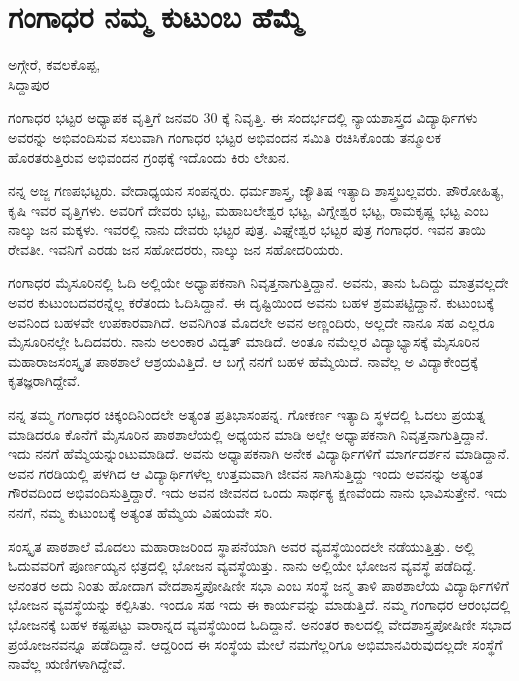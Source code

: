 \chapter{ಗಂಗಾಧರ ನಮ್ಮ ಕುಟುಂಬ ಹೆಮ್ಮೆ}

\begin{center}
\smallskip

ಅಗ್ಗೇರೆ, ಕವಲಕೊಪ್ಪ,\\ 
ಸಿದ್ದಾಪುರ
\addrule
\end{center}
ಗಂಗಾಧರ ಭಟ್ಟರ ಅಧ್ಯಾಪಕ ವೃತ್ತಿಗೆ ಜನವರಿ 30 ಕ್ಕೆ ನಿವೃತ್ತಿ. ಈ ಸಂದರ್ಭದಲ್ಲಿ ನ್ಯಾಯಶಾಸ್ತ್ರದ ವಿದ್ಯಾರ್ಥಿಗಳು ಅವರನ್ನು ಅಭಿವಂದಿಸುವ ಸಲುವಾಗಿ ಗಂಗಾಧರ ಭಟ್ಟರ ಅಭಿವಂದನ ಸಮಿತಿ ರಚಿಸಿಕೊಂಡು ತನ್ಮೂಲಕ ಹೊರತರುತ್ತಿರುವ ಅಭಿವಂದನ ಗ್ರಂಥಕ್ಕೆ ಇದೊಂದು ಕಿರು ಲೇಖನ.

ನನ್ನ ಅಜ್ಜ ಗಣಪಭಟ್ಟರು. ವೇದಾಧ್ಯಯನ ಸಂಪನ್ನರು. ಧರ್ಮಶಾಸ್ತ್ರ, ಜ್ಯೌತಿಷ ಇತ್ಯಾದಿ ಶಾಸ್ತ್ರಬಲ್ಲವರು. ಪೌರೋಹಿತ್ಯ, ಕೃಷಿ ಇವರ ವೃತ್ತಿಗಳು. ಅವರಿಗೆ ದೇವರು ಭಟ್ಟ, ಮಹಾಬಲೇಶ್ವರ ಭಟ್ಟ, ವಿಗ್ನೇಶ್ವರ ಭಟ್ಟ, ರಾಮಕೃಷ್ಣ ಭಟ್ಟ ಎಂಬ ನಾಲ್ಕು ಜನ ಮಕ್ಕಳು. ಇವರಲ್ಲಿ ನಾನು ದೇವರು ಭಟ್ಟರ ಪುತ್ರ. ವಿಘ್ನೇಶ್ವರ ಭಟ್ಟರ ಪುತ್ರ ಗಂಗಾಧರ. ಇವನ ತಾಯಿ ರೇವತೀ. ಇವನಿಗೆ ಎರಡು ಜನ ಸಹೋದರರು, ನಾಲ್ಕು ಜನ ಸಹೋದರಿಯರು.

ಗಂಗಾಧರ ಮೈಸೂರಿನಲ್ಲಿ ಓದಿ ಅಲ್ಲಿಯೇ ಅಧ್ಯಾಪಕನಾಗಿ ನಿವೃತ್ತನಾಗುತ್ತಿದ್ದಾನೆ. ಅವನು, ತಾನು ಓದಿದ್ದು ಮಾತ್ರವಲ್ಲದೇ ಅವರ ಕುಟುಂಬದವರನ್ನೆಲ್ಲ ಕರೆತಂದು ಓದಿಸಿದ್ದಾನೆ. ಈ ದೃಷ್ಟಿಯಿಂದ ಅವನು ಬಹಳ ಶ್ರಮಪಟ್ಟಿದ್ದಾನೆ. ಕುಟುಂಬಕ್ಕೆ ಅವನಿಂದ ಬಹಳವೇ ಉಪಕಾರವಾಗಿದೆ. ಅವನಿಗಿಂತ ಮೊದಲೇ ಅವನ ಅಣ್ಣಂದಿರು, ಅಲ್ಲದೇ ನಾನೂ ಸಹ ಎಲ್ಲರೂ ಮೈಸೂರಿನಲ್ಲೇ ಓದಿದವರು. ನಾನು ಅಲಂಕಾರ ವಿದ್ವತ್ ಮಾಡಿದೆ. ಅಂತೂ ನಮೆಲ್ಲರ ವಿದ್ಯಾಭ್ಯಾಸಕ್ಕೆ ಮೈಸೂರಿನ ಮಹಾರಾಜಸಂಸ್ಕೃತ ಪಾಠಶಾಲೆ ಆಶ್ರಯವಿತ್ತಿದೆ. ಆ ಬಗ್ಗೆ ನನಗೆ ಬಹಳ ಹೆಮ್ಮೆಯಿದೆ. ನಾವೆಲ್ಲ ಅ ವಿದ್ಯಾಕೇಂದ್ರಕ್ಕೆ ಕೃತಜ್ಞರಾಗಿದ್ದೇವೆ. 

ನನ್ನ ತಮ್ಮ ಗಂಗಾಧರ ಚಿಕ್ಕಂದಿನಿಂದಲೇ ಅತ್ಯಂತ ಪ್ರತಿಭಾಸಂಪನ್ನ. ಗೋಕರ್ಣ ಇತ್ಯಾದಿ ಸ್ಥಳದಲ್ಲಿ ಓದಲು ಪ್ರಯತ್ನ ಮಾಡಿದರೂ ಕೊನೆಗೆ ಮೈಸೂರಿನ ಪಾಠಶಾಲೆಯಲ್ಲಿ ಅಧ್ಯಯನ ಮಾಡಿ ಅಲ್ಲೇ ಅಧ್ಯಾಪಕನಾಗಿ ನಿವೃತ್ತನಾಗುತ್ತಿದ್ದಾನೆ. ಇದು ನನಗೆ ಹೆಮ್ಮೆಯನ್ನುಂಟುಮಾಡಿದೆ. ಅವನು ಅಧ್ಯಾಪಕನಾಗಿ ಅನೇಕ ವಿದ್ಯಾರ್ಥಿಗಳಿಗೆ ಮಾರ್ಗದರ್ಶನ ಮಾಡಿದ್ದಾನೆ. ಅವನ ಗರಡಿಯಲ್ಲಿ ಪಳಗಿದ ಆ ವಿದ್ಯಾರ್ಥಿಗಳೆಲ್ಲ ಉತ್ತಮವಾಗಿ ಜೀವನ ಸಾಗಿಸುತ್ತಿದ್ದು ಇಂದು ಅವನನ್ನು ಅತ್ಯಂತ ಗೌರವದಿಂದ ಅಭಿವಂದಿಸುತ್ತಿದ್ದಾರೆ. ಇದು ಅವನ ಜೀವನದ ಒಂದು ಸಾರ್ಥಕ್ಯ ಕ್ಷಣವೆಂದು ನಾನು ಭಾವಿಸುತ್ತೇನೆ. ಇದು ನನಗೆ, ನಮ್ಮ ಕುಟುಂಬಕ್ಕೆ ಅತ್ಯಂತ ಹೆಮ್ಮೆಯ ವಿಷಯವೇ ಸರಿ.

ಸಂಸ್ಕೃತ ಪಾಠಶಾಲೆ ಮೊದಲು ಮಹಾರಾಜರಿಂದ ಸ್ಥಾಪನೆಯಾಗಿ ಅವರ ವ್ಯವಸ್ಥೆಯಿಂದಲೇ ನಡೆಯುತ್ತಿತ್ತು. ಅಲ್ಲಿ ಓದುವವರಿಗೆ ಪೂರ್ಣಯ್ಯನ ಛತ್ರದಲ್ಲಿ ಭೋಜನ ವ್ಯವಸ್ಥೆಯಿತ್ತು. ನಾನು ಅಲ್ಲಿಯೇ ಭೋಜನ ವ್ಯವಸ್ಥೆ ಪಡೆದಿದ್ದೆ. ಅನಂತರ ಅದು ನಿಂತು ಹೋದಾಗ ವೇದಶಾಸ್ತ್ರಪೋಷಿಣೀ ಸಭಾ ಎಂಬ ಸಂಸ್ಥೆ ಜನ್ಮ ತಾಳಿ ಪಾಠಶಾಲೆಯ ವಿದ್ಯಾರ್ಥಿಗಳಿಗೆ ಭೋಜನ ವ್ಯವಸ್ಥೆಯನ್ನು ಕಲ್ಪಿಸಿತು. ಇಂದೂ ಸಹ ಇದು ಈ ಕಾರ್ಯವನ್ನು ಮಾಡುತ್ತಿದೆ. ನಮ್ಮ ಗಂಗಾಧರ ಆರಂಭದಲ್ಲಿ ಭೋಜನಕ್ಕೆ ಬಹಳ ಕಷ್ಟಪಟ್ಟು ವಾರಾನ್ನದ ವ್ಯವಸ್ಥೆಯಿಂದ ಓದಿದ್ದಾನೆ. ಅನಂತರ ಕಾಲದಲ್ಲಿ ವೇದಶಾಸ್ತ್ರಪೋಷಿಣೀ ಸಭಾದ ಪ್ರಯೋಜನವನ್ನೂ ಪಡೆದಿದ್ದಾನೆ. ಆದ್ದರಿಂದ ಈ ಸಂಸ್ಥೆಯ ಮೇಲೆ ನಮಗೆಲ್ಲರಿಗೂ ಅಭಿಮಾನವಿರುವುದಲ್ಲದೇ ಸಂಸ್ಥೆಗೆ ನಾವೆಲ್ಲ ಋಣಿಗಳಾಗಿದ್ದೇವೆ. 

